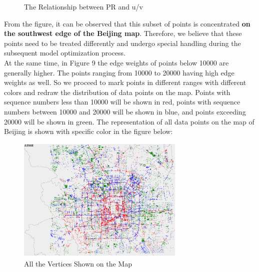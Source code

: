 \begin{figure}[H]%
    \centering
    \caption{The Relationship between PR and u/v}
\end{figure}
\indent From the figure, it can be observed that this subset of points is concentrated \textbf{on the southwest edge of the Beijing map}. Therefore, we believe that these points need to be treated differently and undergo special handling during the subsequent model optimization process.\\
\indent At the same time, in Figure 9 the edge weights of points below 10000 are generally higher. The points ranging from 10000 to 20000 having high edge weights as well. So we proceed to mark points in different ranges with different colors and redraw the distribution of data points on the map. Points with sequence numbers less than 10000 will be shown in red, points with sequence numbers between 10000 and 20000 will be shown in blue, and points exceeding 20000 will be shown in green. The representation of all data points on the map of Beijing is shown with specific color in the figure below:
\begin{figure}[H]%
    \centering
    \includegraphics[width=8cm,height=6cm]{北京地图.png}
    \caption{All the Vertices Shown on the Map}
\end{figure}
